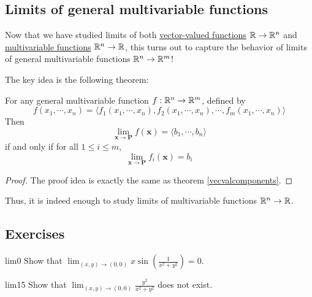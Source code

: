     
    
    
    

\subsection{Limits of general multivariable functions}\label{limgenmulti}
    
    Now that we have studied limits of both \hyperref[limvectorval]{vector-valued functions} $\mathbb{R} \to \mathbb{R}^n$ and \hyperref[limmulti]{multivariable functions} $\mathbb{R}^n \to \mathbb{R}$, this turns out to capture the behavior of limits of general multivariable functions $\mathbb{R}^n \to \mathbb{R}^m$!
    
    The key idea is the following theorem:
    
    \begin{theorem}\label{thm:genmultilimit}
    For any general multivariable function $f : \mathbb{R}^n \to \mathbb{R}^m$, defined by 
$$f(x_1, \cdots, x_n) = \big\langle f_1(x_1, \cdots, x_n), f_2(x_1, \cdots, x_n), \cdots, f_m(x_1, \cdots, x_n) \big\rangle$$
Then 
$$\lim_{\bm{x} \to \bm{P}} f(\bm{x}) = \langle b_1, \cdots, b_n \rangle$$ if and only if for all $1 \leq i \leq m$, $$ \lim_{\bm{x} \to \bm{P}} f_i(\bm{x}) = b_i$$

    \end{theorem}
    
    \begin{proof}
    The proof idea is exactly the same as theorem \ref{vecvalcomponents}.
    \end{proof}
    
    Thus, it is indeed enough to study limits of multivariable functions $\mathbb{R}^n \to \mathbb{R}$.
    
    
    
    
    

\subsection{Exercises}



\begin{problem}{lim0}
Show that $\lim_{(x,y) \to (0,0)} x\sin(\frac{1}{x^2 + y^2}) =0$.
\end{problem}

\begin{problem}{lim15}
Show that $\lim_{(x,y) \to (0,0)} \frac{y^2}{x^2 + y^2}$ does not exist.
\end{problem}

